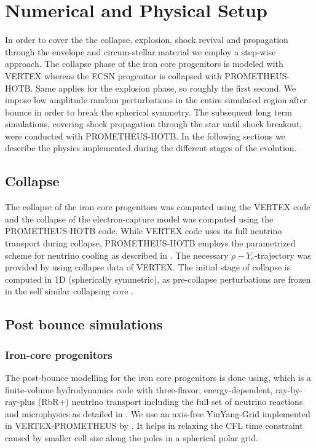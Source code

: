 \documentclass[fleqn,usenatbib]{mnras}
\newcommand{\prom}{\textsc{P{\footnotesize ROMETHEUS}-H{\footnotesize OT}B}\xspace}
\newcommand{\vertexprom}{\textsc{V{\footnotesize ERTEX}-P{\footnotesize ROMETHEUS}}\xspace}
\newcommand{\vertex}{\textsc{V{\footnotesize ERTEX}}\xspace}
\newcommand{\NY}[2]{{\color{blue}\sout{#1}#2}}
\begin{document}
\section{Numerical and Physical Setup}
\label{sec:explosionModeling}
In order to cover the the collapse, explosion, shock revival and propagation through the envelope and circum-stellar material we employ a step-wise approach.
The collapse phase of the iron core progenitors is modeled with \vertex whereas the ECSN progenitor is collapsed with \prom.
Same applies for the explosion phase, so roughly the first second.  We impose low amplitude random perturbations in the entire simulated region after bounce in order to break the spherical symmetry. 
The subsequent long term simulations, covering shock propagation through the star until shock breakout, were conducted with \prom.
In the following sections we describe the physics implemented during the different stages of the evolution.

\subsection{Collapse}
The collapse of the iron core progenitors was computed using the \vertex code and the collapse of the  electron-capture model was computed using the \NY{}{\prom} code. While \vertex code uses its full neutrino transport during collapse, \prom employs the parametrized scheme for neutrino cooling as described in \citet{Liebendoerfer2005}. The necessary $\rho-Y_{e}$-trajectory was provided by \cite{Huedepohl2018} using collapse data of \vertex.
The initial stage of collapse is computed in  1D (spherically symmetric), as pre-collapse perturbations are frozen in the self similar collapsing core \citep{Marek2006}.

\subsection{Post bounce simulations}
\subsubsection{Iron-core progenitors}
The post-bounce modelling for the iron core progenitors is done using, which is a finite-volume hydrodynamics code with three-flavor, energy-dependent, ray-by-ray-plus (RbR+) neutrino transport including the full set of neutrino reactions and microphysics as detailed in \cite{Rampp2002}. We use an axis-free YinYang-Grid \cite{Kageyama2004} implemented in \vertexprom by \cite{Melson2015a}. It  helps in relaxing the CFL time constraint caused by smaller cell size along the poles in a spherical polar grid. 
\end{document}
